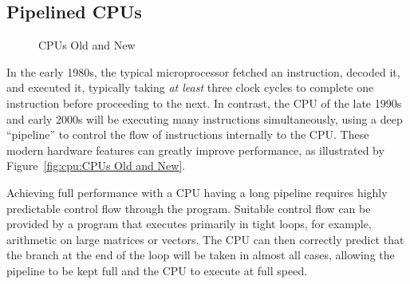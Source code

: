 \subsection{Pipelined CPUs}
\label{sec:cpu:Pipelined CPUs}

\begin{figure}[tb]
\begin{center}
\end{center}
\caption{CPUs Old and New}
\end{figure}

In the early 1980s, the typical microprocessor fetched an instruction,
decoded it, and executed it, typically taking \emph{at least} three
clock cycles to complete one instruction before proceeding to the next.
In contrast, the CPU of the late 1990s and early 2000s will be executing
many instructions simultaneously, using a deep ``pipeline'' to control
the flow of instructions internally to the CPU.
These modern hardware features can greatly improve performance, as
illustrated by Figure~\ref{fig:cpu:CPUs Old and New}.

Achieving full performance with a CPU having a long pipeline requires
highly predictable control flow through the program.
Suitable control flow can be provided by a program that executes primarily
in tight loops, for example, arithmetic on large matrices or vectors.
The CPU can then correctly predict that the branch at the end of the loop
will be taken in almost all cases,
allowing the pipeline to be kept full and the CPU to execute at full speed.

